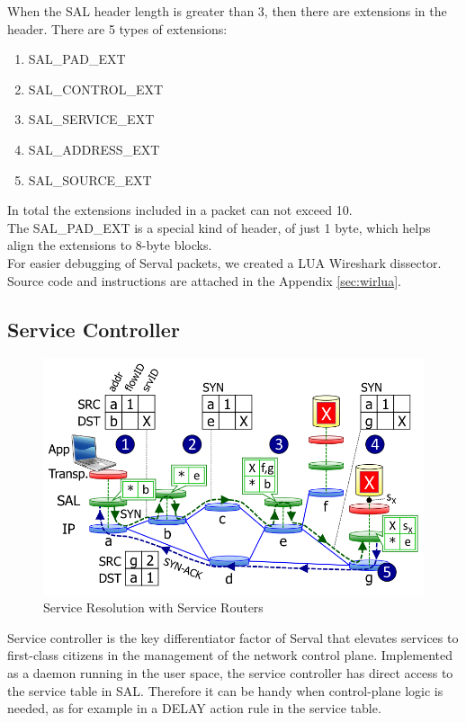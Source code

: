 When the SAL header length is greater than 3, then there are extensions in the header.
There are 5 types of extensions:
\begin{enumerate} \itemsep1pt \parskip0pt 
  \item SAL\_PAD\_EXT
  \item SAL\_CONTROL\_EXT
  \item SAL\_SERVICE\_EXT
  \item SAL\_ADDRESS\_EXT
  \item SAL\_SOURCE\_EXT
\end{enumerate}
In total the extensions included in a packet can not exceed 10.
\\ The SAL\_PAD\_EXT is a special kind of header, of just 1 byte, which helps align the extensions to 8-byte blocks.
\\[0.2cm]
\noindent For easier debugging of Serval packets, we created a LUA Wireshark dissector.
Source code and instructions are attached in the Appendix \ref{sec:wirlua}.



\newpage
\subsection{Service Controller}

\begin{figure}
\centering
{}
\includegraphics[scale=0.4]{figures/establishing_connection}
\caption[Service Resolution with Service Routers]{Service Resolution with Service Routers}
\label{fig:sal_position}
\end{figure}

Service controller is the key differentiator factor of Serval that elevates services to first-class citizens in the management of the network control plane.
Implemented as a daemon running in the user space, the service controller has direct access to the service table in SAL.
Therefore it can be handy when control-plane logic is needed, as for example in a DELAY action rule in the service table.

